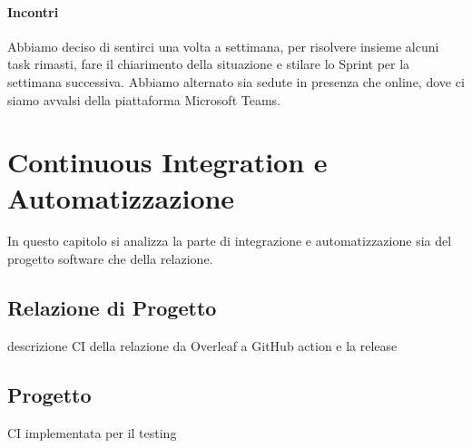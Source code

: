     \paragraph{Incontri}
    Abbiamo deciso di sentirci una volta a settimana, per risolvere insieme alcuni task rimasti, fare il chiarimento della situazione e stilare lo Sprint per la settimana successiva. Abbiamo alternato sia sedute in presenza che online, dove ci siamo avvalsi della piattaforma Microsoft Teams.
    
     

\section{Continuous Integration e Automatizzazione}
\label{chap:CI}
In questo capitolo si analizza la parte di integrazione e automatizzazione sia del progetto software che della relazione. 
    \subsection{Relazione di Progetto}
        descrizione CI della relazione da Overleaf a GitHub action e la release

    \subsection{Progetto}
        CI implementata per il testing 
        
        





